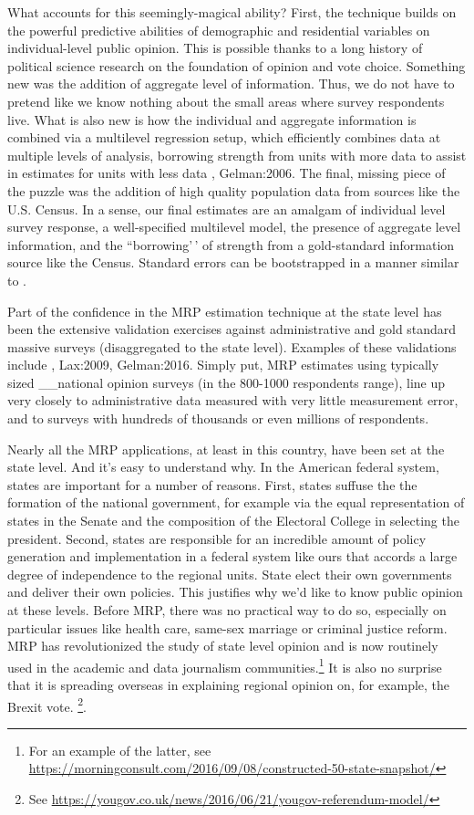 \documentclass[
  oneside]{book}
\begin{document}
What accounts for this seemingly-magical ability? First, the technique builds on the powerful predictive abilities of demographic and residential variables on individual-level public opinion. This is possible thanks to a long history of political science research on the foundation of opinion and vote choice. Something new was the addition of aggregate level of information. Thus, we do not have to pretend like we know nothing about the small areas where survey respondents live. What is also new is how the individual and aggregate information is combined via a multilevel regression setup, which efficiently combines data at multiple levels of analysis, borrowing strength from units with more data to assist in estimates for units with less data \citet{Raudenbush:2002}, Gelman:2006. The final, missing piece of the puzzle was the addition of high quality population data from sources like the U.S. Census. In a sense, our final estimates are an amalgam of individual level survey response, a well-specified multilevel model, the presence of aggregate level information, and the ``borrowing'\,' of strength from a gold-standard information source like the Census. Standard errors can be bootstrapped in a manner similar to \citet{Kastellec:2015}.

Part of the confidence in the MRP estimation technique at the state level has been the extensive validation exercises against administrative and gold standard massive surveys (disaggregated to the state level). Examples of these validations include \citet{Park:2004}, Lax:2009, Gelman:2016. Simply put, MRP estimates using typically sized \_\_national opinion surveys (in the 800-1000 respondents range), line up very closely to administrative data measured with very little measurement error, and to surveys with hundreds of thousands or even millions of respondents.

Nearly all the MRP applications, at least in this country, have been set at the state level. And it's easy to understand why. In the American federal system, states are important for a number of reasons. First, states suffuse the the formation of the national government, for example via the equal representation of states in the Senate and the composition of the Electoral College in selecting the president. Second, states are responsible for an incredible amount of policy generation and implementation in a federal system like ours that accords a large degree of independence to the regional units. State elect their own governments and deliver their own policies. This justifies why we'd like to know public opinion at these levels. Before MRP, there was no practical way to do so, especially on particular issues like health care, same-sex marriage or criminal justice reform. MRP has revolutionized the study of state level opinion and is now routinely used in the academic and data journalism communities.\footnote{For an example of the latter, see \url{https://morningconsult.com/2016/09/08/constructed-50-state-snapshot/}} It is also no surprise that it is spreading overseas in explaining regional opinion on, for example, the Brexit vote. \footnote{See \url{https://yougov.co.uk/news/2016/06/21/yougov-referendum-model/}}.
\end{document}
